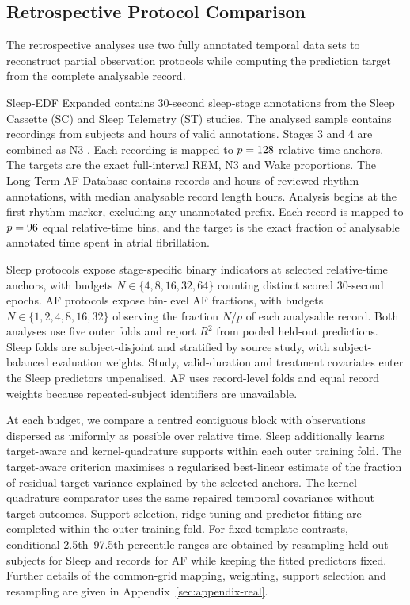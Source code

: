 \subsection{Retrospective Protocol Comparison}
\label{sec:real}

The retrospective analyses use two fully annotated temporal data sets to
reconstruct partial observation protocols while computing the prediction target
from the complete analysable record. 

Sleep-EDF Expanded
\citep{kemp2000analysis,mourtazaev1995age,goldberger2000physiobank,
pollard2026physionet} contains 30-second sleep-stage annotations from the
Sleep Cassette (SC) and Sleep Telemetry (ST) studies. The analysed sample
contains \numSleepRecordings{} recordings from \numSleepSubjects{} subjects and
\numSleepHours{} hours of valid annotations. Stages 3 and 4 are combined as N3
\citep{rechtschaffen1968manual,iber2007aasm}. Each recording is mapped to
$p=128$ relative-time anchors. The targets are the exact full-interval
REM, N3 and Wake proportions. The Long-Term AF Database
\citep{petrutiu2007abrupt,goldberger2000physiobank} contains
\numLtafRecords{} records and \numLtafHours{} hours of reviewed rhythm
annotations, with median analysable record length \numLtafMedianHours{} hours.
Analysis begins at the first rhythm marker, excluding any unannotated prefix.
Each record is mapped to $p=96$ equal relative-time bins, and the target
is the exact fraction of analysable annotated time spent in atrial fibrillation.

Sleep protocols expose stage-specific binary indicators at selected
relative-time anchors, with budgets $N\in\{4,8,16,32,64\}$ counting distinct
scored 30-second epochs. AF protocols expose bin-level AF fractions, with
budgets $N\in\{1,2,4,8,16,32\}$ observing the fraction $N/p$ of each analysable
record. Both analyses use five outer folds and report $R^2$ from pooled held-out
predictions. Sleep folds are subject-disjoint and stratified by source study,
with subject-balanced evaluation weights. Study, valid-duration and treatment
covariates enter the Sleep predictors unpenalised. AF uses record-level folds
and equal record weights because repeated-subject identifiers are unavailable.

At each budget, we compare a centred contiguous block with observations
dispersed as uniformly as possible over relative time. Sleep additionally
learns target-aware and kernel-quadrature supports within each outer training
fold. The target-aware criterion maximises a regularised best-linear estimate
of the fraction of residual target variance explained by the selected anchors.
The kernel-quadrature comparator uses the same repaired temporal covariance
without target outcomes. Support selection, ridge tuning and predictor fitting
are completed within the outer training fold. For fixed-template contrasts, conditional 2.5th--97.5th percentile ranges are
obtained by resampling held-out subjects for Sleep and records for AF while
keeping the fitted predictors fixed. Further details of the common-grid
mapping, weighting, support selection and resampling are given in
Appendix~\ref{sec:appendix-real}.

